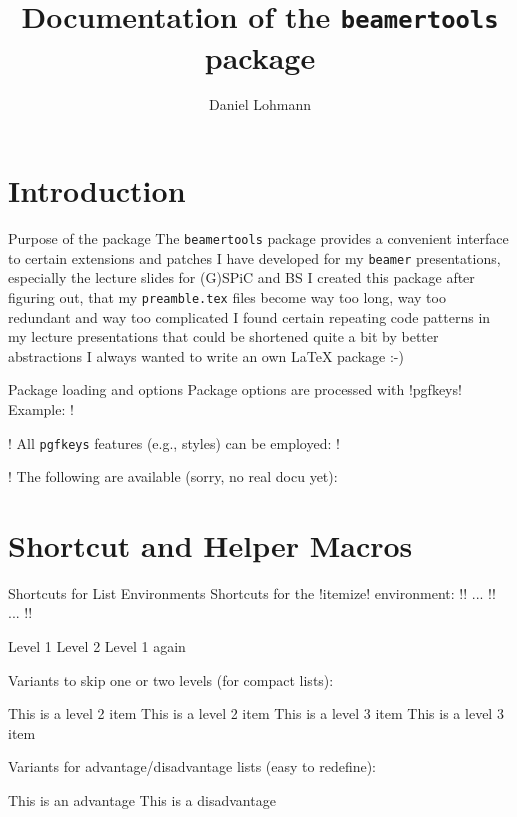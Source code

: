 \documentclass{beamer}
\def\beamertools{\texttt{beamertools}\xspace}
\begin{document}
\title[beamertools]{Documentation of the \beamertools package}
\author[dl] {Daniel Lohmann}
\date{}

\begin{frame}[plain]
  \titlepage
\end{frame}

\section{Introduction}

\begin{frame}{Purpose of the package}
  \btUseExtraItemSep[\medskipamount]
  \bi
    \ii The \beamertools package provides a convenient interface to certain extensions and patches I have developed for my \texttt{beamer} presentations, especially the lecture slides for (G)SPiC and BS 
    \ii I created this package after figuring out, that
      \bi
        \ii my \texttt{preamble.tex} files become way too long, way too redundant and way too complicated
        \ii I found certain repeating code patterns in my lecture presentations that could be shortened quite a bit by better abstractions
        \ii I always wanted to write an own \LaTeX{} package :-)
      \ei
  \ei
\end{frame}
\begin{frame}[fragile,t]{Package loading and options}
  \bi
    \ii Package options are processed with !pgfkeys!
      \bi
        \ii Example: !\usepackage[autonotes,notikz]{beamertools}! 
         All \lstinline{pgfkeys} features (e.g., styles) can be employed:
           !\usepackage[spic]{beamertools}! 
      \ei
      \ii The following  are available (sorry, no real docu yet):
  \ei
  \only<1>{}
\end{frame}

\section{Shortcut and Helper Macros}

\begin{frame}[fragile]{Shortcuts for List Environments}
Shortcuts for the !itemize! environment: !\bi! ... !\ii! ... !\ei!
\begin{LTXexample}[pos=r]
  \bi
    \ii<+-> Level 1
      \bi
        \ii Level 2
      \ei
    \ii<+-> Level 1 again
  \ei
\end{LTXexample}
Variants to skip one or two levels (for compact lists):
\begin{LTXexample}[pos=r]
  \bii
    \ii This is a level 2 item
    \ii This is a level 2 item
  \eii
  \biii
    \ii This is a level 3 item
    \ii This is a level 3 item
  \eiii
\end{LTXexample}
Variants for advantage/disadvantage lists (easy to redefine):
\begin{LTXexample}[pos=r]
  \bii
    \iiad This is an advantage
    \iida This is a disadvantage
  \eii
\end{LTXexample}
\end{frame}
\end{document}
